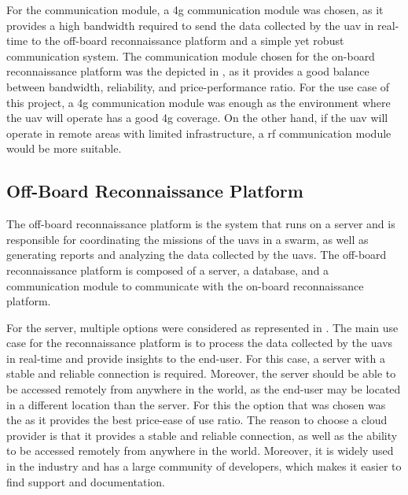 

For the communication module, a \gls{4g} communication module was chosen, as it provides a high bandwidth required to send the data collected by the \gls{uav} in real-time to the off-board reconnaissance platform and a simple yet robust communication system. The communication module chosen for the on-board reconnaissance platform was the  depicted in , as it provides a good balance between bandwidth, reliability, and price-performance ratio. For the use case of this project, a \gls{4g} communication module was enough as the environment where the \gls{uav} will operate has a good \gls{4g} coverage. On the other hand, if the \gls{uav} will operate in remote areas with limited infrastructure, a \gls{rf} communication module would be more suitable.


\subsection{Off-Board Reconnaissance Platform}\label{subsec:off-board_reconnaissance_platform}

The off-board reconnaissance platform is the system that runs on a server and is responsible for coordinating the missions of the \glspl{uav} in a swarm, as well as generating reports and analyzing the data collected by the \glspl{uav}. The off-board reconnaissance platform is composed of a server, a database, and a communication module to communicate with the on-board reconnaissance platform.

For the server, multiple options were considered as represented in . The main use case for the reconnaissance platform is to process the data collected by the \glspl{uav} in real-time and provide insights to the end-user. For this case, a server with a stable and reliable connection is required. Moreover, the server should be able to be accessed remotely from anywhere in the world, as the end-user may be located in a different location than the server. For this the option that was chosen was the  as it provides the best price-ease of use ratio. The reason to choose a cloud provider is that it provides a stable and reliable connection, as well as the ability to be accessed remotely from anywhere in the world. Moreover, it is widely used in the industry and has a large community of developers, which makes it easier to find support and documentation.

